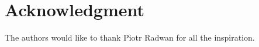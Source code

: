 \documentclass[journal]{journal}
\begin{document}
\section*{Acknowledgment}


The authors would like to thank Piotr Radwan for all the inspiration.

	
	
	
	
	
	
	
	
	
	
	
	
	
	
	
\end{document}
